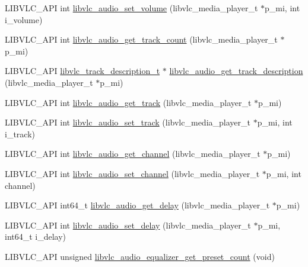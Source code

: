 \begin{DoxyCompactItemize}
\item 
L\+I\+B\+V\+L\+C\+\_\+\+A\+PI int \hyperlink{group__libvlc__audio_ga56911e6b6cd4878796277c19203302a3}{libvlc\+\_\+audio\+\_\+set\+\_\+volume} (libvlc\+\_\+media\+\_\+player\+\_\+t $\ast$p\+\_\+mi, int i\+\_\+volume)
\item 
L\+I\+B\+V\+L\+C\+\_\+\+A\+PI int \hyperlink{group__libvlc__audio_ga1144b135e4b05e839ee17afa59014d01}{libvlc\+\_\+audio\+\_\+get\+\_\+track\+\_\+count} (libvlc\+\_\+media\+\_\+player\+\_\+t $\ast$p\+\_\+mi)
\item 
L\+I\+B\+V\+L\+C\+\_\+\+A\+PI \hyperlink{structlibvlc__track__description__t}{libvlc\+\_\+track\+\_\+description\+\_\+t} $\ast$ \hyperlink{group__libvlc__audio_ga1e404c0c8d57ea0d9725c96f12ff494f}{libvlc\+\_\+audio\+\_\+get\+\_\+track\+\_\+description} (libvlc\+\_\+media\+\_\+player\+\_\+t $\ast$p\+\_\+mi)
\item 
L\+I\+B\+V\+L\+C\+\_\+\+A\+PI int \hyperlink{group__libvlc__audio_gadabd5adec2b51568225004c3e58fbc2d}{libvlc\+\_\+audio\+\_\+get\+\_\+track} (libvlc\+\_\+media\+\_\+player\+\_\+t $\ast$p\+\_\+mi)
\item 
L\+I\+B\+V\+L\+C\+\_\+\+A\+PI int \hyperlink{group__libvlc__audio_gae013e4cf0ae73c093f1a1da1af765d21}{libvlc\+\_\+audio\+\_\+set\+\_\+track} (libvlc\+\_\+media\+\_\+player\+\_\+t $\ast$p\+\_\+mi, int i\+\_\+track)
\item 
L\+I\+B\+V\+L\+C\+\_\+\+A\+PI int \hyperlink{group__libvlc__audio_gad8f6f73c42a73a189100bb9eb6418be0}{libvlc\+\_\+audio\+\_\+get\+\_\+channel} (libvlc\+\_\+media\+\_\+player\+\_\+t $\ast$p\+\_\+mi)
\item 
L\+I\+B\+V\+L\+C\+\_\+\+A\+PI int \hyperlink{group__libvlc__audio_ga9a3227c877b304588b3bd0e1c093b737}{libvlc\+\_\+audio\+\_\+set\+\_\+channel} (libvlc\+\_\+media\+\_\+player\+\_\+t $\ast$p\+\_\+mi, int channel)
\item 
L\+I\+B\+V\+L\+C\+\_\+\+A\+PI int64\+\_\+t \hyperlink{group__libvlc__audio_gab843aa707ea125e630acb086909d5962}{libvlc\+\_\+audio\+\_\+get\+\_\+delay} (libvlc\+\_\+media\+\_\+player\+\_\+t $\ast$p\+\_\+mi)
\item 
L\+I\+B\+V\+L\+C\+\_\+\+A\+PI int \hyperlink{group__libvlc__audio_ga8e2d21265f597723e978d325cab285b5}{libvlc\+\_\+audio\+\_\+set\+\_\+delay} (libvlc\+\_\+media\+\_\+player\+\_\+t $\ast$p\+\_\+mi, int64\+\_\+t i\+\_\+delay)
\item 
L\+I\+B\+V\+L\+C\+\_\+\+A\+PI unsigned \hyperlink{group__libvlc__audio_gad75abcc5fbdc2d620808df6516a8e7fe}{libvlc\+\_\+audio\+\_\+equalizer\+\_\+get\+\_\+preset\+\_\+count} (void)

\end{DoxyCompactItemize}
